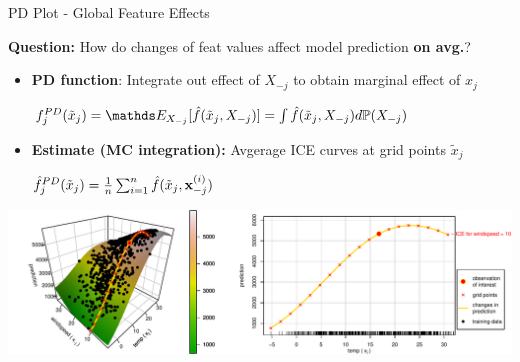 \documentclass[10pt,compress,t,notes=noshow, xcolor=table]{beamer}
\begin{document}
\begin{frame}{PD Plot - Global Feature Effects}

\textbf{Question:} How do changes of feat values affect model prediction \textbf{on avg.}?


\begin{itemize}
    \item \textbf{PD function}: Integrate out effect of $X_{-j}$ to obtain marginal effect of $x_j$
    
    \medskip
    
    \centerline{$ \textstyle
    f_j^{PD}(\tilde x_j) = \E_{X_{-j}}[\hat f(\tilde x_j, X_{-j})] = \int \hat f(\tilde x_j, X_{-j}) d \mathbb{P}(X_{-j})
    $}

    \smallskip
    
    \item \textbf{Estimate (MC integration):} Avgerage ICE curves at grid points $\tilde x_j$
    
    \medskip
    
    \centerline{$ \textstyle
    \hat f_j^{PD}(\tilde x_j) = \frac{1}{n} \sum_{i=1}^{n} \hat f(\tilde x_j, \mathbf{x}_{-j}^{(i)})
    $}
\end{itemize}


\vfill
\centering
\includegraphics[width=\textwidth, page = 2]{figure/ice_motivation_bike}

\end{frame}
\end{document}
